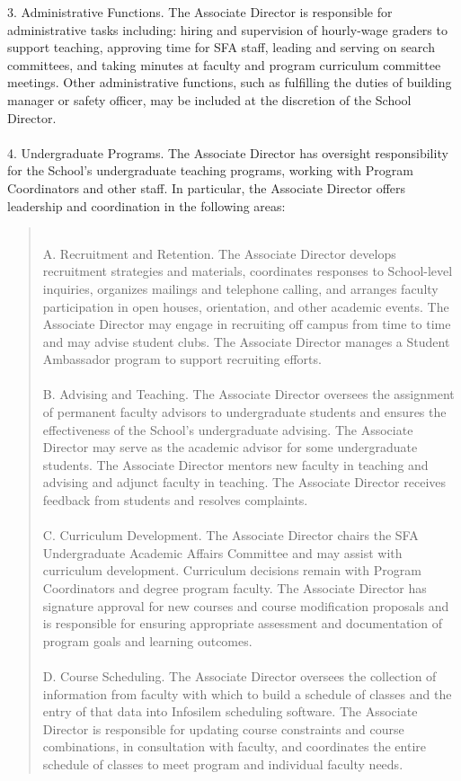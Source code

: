 \documentclass[11pt]{article}
\begin{document}
3. Administrative Functions.  The Associate Director is responsible for administrative tasks including: hiring and supervision of hourly-wage graders to support teaching, approving time for SFA staff, leading and serving on search committees, and taking minutes at faculty and program curriculum committee meetings.  Other administrative functions, such as fulfilling the duties of building manager or safety officer, may be included at the discretion of the School Director.
\\~\\
4. Undergraduate Programs.  The Associate Director has oversight responsibility for the School’s undergraduate teaching programs, working with Program Coordinators and other staff.  In particular, the Associate Director offers leadership and coordination in the following areas:
\begin{quote}
	~\\
A. Recruitment and Retention. The Associate Director develops recruitment strategies and materials, coordinates responses to School-level inquiries, organizes mailings and telephone calling, and arranges faculty participation in open houses, orientation, and other academic events.  The Associate Director may engage in recruiting off campus from time to time and may advise student clubs.  The Associate Director manages a Student Ambassador program to support recruiting efforts.
\\~\\
B. Advising and Teaching. The Associate Director oversees the assignment of permanent faculty advisors to undergraduate students and ensures the effectiveness of the School’s undergraduate advising.  The Associate Director may serve as the academic advisor for some undergraduate students.  The Associate Director mentors new faculty in teaching and advising and adjunct faculty in teaching.  The Associate Director receives feedback from students and resolves complaints.
\\~\\
C. Curriculum Development. The Associate Director chairs the SFA Undergraduate Academic Affairs Committee and may assist with curriculum development.  Curriculum decisions remain with Program Coordinators and degree program faculty.  The Associate Director has signature approval for new courses and course modification proposals and is responsible for ensuring appropriate assessment and documentation of program goals and learning outcomes.
\\~\\
D. Course Scheduling. The Associate Director oversees the collection of information from faculty with which to build a schedule of classes and the entry of that data into Infosilem scheduling software.  The Associate Director is responsible for updating course constraints and course combinations, in consultation with faculty, and coordinates the entire schedule of classes to meet program and individual faculty needs.

\end{quote}
\end{document}
